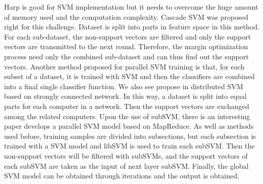 Harp is good for SVM implementation but it needs to overcome the huge amount of memory used and the computation complexity. Cascade SVM\cite{graf2004parallel} was proposed right for this challenge. Dataset is split into parts in feature space in this method. For each sub-dataset, the non-support vectors are filtered and only the support vectors are transmitted to the next round. Therefore, the margin optimization process need only the combined sub-dataset and can thus find out the support vectors. Another method proposed for parallel SVM training is that, for each subset of a dataset, it is trained with SVM and then the classifiers are combined into a final single classifier function. We also see propose in distributed SVM based on strongly connected network\cite{lu2008distributed}. In this way, a dataset is split into equal parts for each computer in a network. Then the support vectors are exchanged among the related computers. Upon the use of subSVM, there is an interesting paper develops a parallel SVM model based on MapReduce. As well as methods used before, training samples are divided into subsections, but each subsection is trained with a SVM model and libSVM\cite{chang2011libsvm} is used to train each subSVM. Then the non-support vectors will be filtered with subSVMs, and the support vectors of each subSVM are taken as the input of next layer subSVM. Finally, the global SVM model can be obtained through iterations and the output is obtained.

